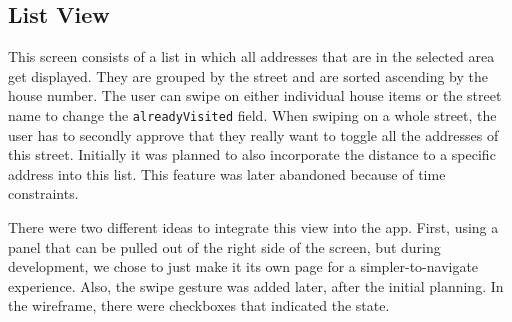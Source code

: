 \subsection{List View}

This screen consists of a list in which all addresses that are in the selected area get displayed. They are grouped by the street and are sorted ascending by the house number. The user can swipe on either individual house items or the street name to change the \texttt{alreadyVisited} field. When swiping on a whole street, the user has to secondly approve that they really want to toggle all the addresses of this street. Initially it was planned to also incorporate the distance to a specific address into this list. This feature was later abandoned because of time constraints. 

\blankLine

There were two different ideas to integrate this view into the app. First, using a panel that can be pulled out of the right side of the screen, but during development, we chose to just make it its own page for a simpler-to-navigate experience. Also, the swipe gesture was added later, after the initial planning. In the wireframe, there were checkboxes that indicated the state.

